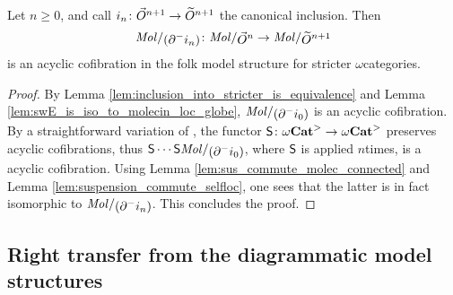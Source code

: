 \begin{prop} \label{prop:walking_eq_of_dim_n}
    Let \( n \geq 0 \), and call \( i_n \colon \vec{O}^{n + 1} \to \widetilde{O}^{n + 1} \) the canonical inclusion.
    Then 
    \begin{equation*}
        \molecin{(\bd{}{-} i_n)} \colon \molecin{\dglobe{n}} \to \molecin{\rglobe{n + 1}} 
    \end{equation*}
    is an acyclic cofibration in the folk model structure for stricter \( \omega \)\nbd categories.
\end{prop}
\begin{proof}
    By Lemma \ref{lem:inclusion_into_stricter_is_equivalence} and Lemma \ref{lem:swE_is_iso_to_molecin_loc_globe}, \( \molecin{(\bd{}{-} i_0)} \) is an acyclic cofibration.
    By a straightforward variation of \cite[Proposition 2.8]{hadzihasanovic2024model}, the functor \( \mathsf{S}{} \colon {\omega\mathbf{Cat}}^> \to {\omega\mathbf{Cat}}^> \) preserves acyclic cofibrations, thus \( \sus{}\cdots\sus{\molecin{(\bd{}{-} i_0)}} \), where \( \mathsf{S}{} \) is applied \( n \)\nbd times, is a acyclic cofibration.
    Using Lemma \ref{lem:sus_commute_molec_connected} and Lemma \ref{lem:suspension_commute_selfloc}, one sees that the latter is in fact isomorphic to \( \molecin{(\bd{}{-} i_n)} \).
    This concludes the proof.
\end{proof}

\subsection{Right transfer from the diagrammatic model structures}

